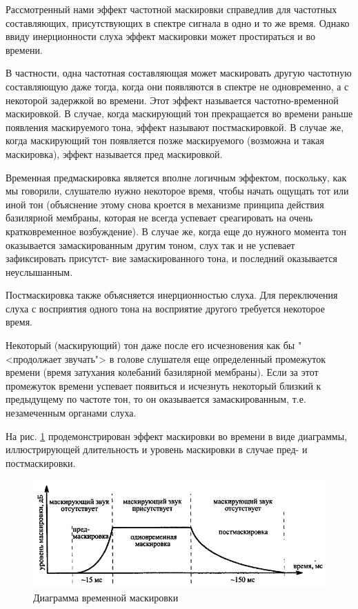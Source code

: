 \documentclass[oneside, final, 14pt]{extreport}
\begin{document}
Рассмотренный нами эффект частотной маскировки справедлив для частотных составляющих, присутствующих в спектре сигнала в одно и то же время. Однако ввиду инерционности слуха эффект маскировки может простираться и во времени.

В частности, одна частотная составляющая может маскировать другую частотную составляющую даже тогда, когда они появляются в спектре не одновременно, а с некоторой задержкой во времени. Этот эффект называется частотно-временной маскировкой. В случае, когда маскирующий тон прекращается во времени раньше появления маскируемого тона, эффект называют постмаскировкой. В случае же, когда маскирующий тон появляется позже маскируемого (возможна и такая маскировка), эффект называется пред маскировкой.

Временная предмаскировка является вполне логичным эффектом, поскольку, как мы говорили, слушателю нужно некоторое время, чтобы начать ощущать тот или иной тон (объяснение этому снова кроется в механизме принципа действия базилярной мембраны, которая не всегда успевает среагировать на очень кратковременное возбуждение). В случае же, когда еще до нужного момента тон оказывается замаскированным другим тоном, слух так и не успевает зафиксировать присутст-
вие замаскированного тона, и последний оказывается неуслышанным.

Постмаскировка также объясняется инерционностью слуха. Для переключения слуха с восприятия одного тона на восприятие другого требуется некоторое время.

Некоторый (маскирующий) тон даже после его исчезновения как бы "<продолжает звучать">
 в голове слушателя еще определенный промежуток времени (время затухания колебаний базилярной мембраны). Если за этот промежуток времени успевает появиться и исчезнуть некоторый близкий к предыдущему по частоте тон, то он оказывается замаскированным, т.е. незамеченным органами слуха.

На рис. \ref{pic-ear-13} продемонстрирован эффект маскировки во времени в виде диаграммы, иллюстрирующей длительность и уровень маскировки в случае пред- и постмаскировки.

\begin{figure}[h]
\centering
\includegraphics[scale=0.8]{pic-ear-13}
\caption{Диаграмма временной маскировки}
\label{pic-ear-13}
\end{figure}
\end{document}

